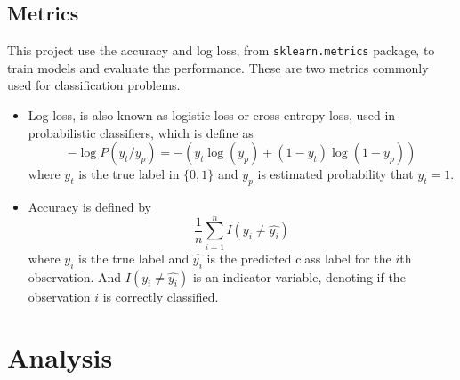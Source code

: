 \documentclass[12pt]{article}
\begin{document}
\subsection{Metrics} 
This project use the accuracy and log loss, from \verb|sklearn.metrics| package, to train models and evaluate the performance. These are two metrics commonly used for classification problems.
\begin{itemize}
\item Log loss, is also known as logistic loss or cross-entropy loss, used in probabilistic classifiers, which is define as 
\begin{equation}
-\log P(y_t/y_p) = -(y_t\log (y_p) + (1-y_t)\log (1-y_p))
\end{equation}
where $y_t$ is the true label in $\{0, 1\}$ and $y_p$ is estimated probability that $y_t = 1$.
\item Accuracy is defined by
\begin{equation}
\frac{1}{n}\sum_{i=1}^n I(y_i \neq \hat{y_i})
\end{equation}
where $y_i$ is the true label and $\hat{y_i}$ is the predicted class label for the $i$th observation. And $I(y_i \neq \hat{y_i})$ is an indicator variable, denoting if the observation $i$ is correctly classified.
\end{itemize}



\section{Analysis}
\end{document}
